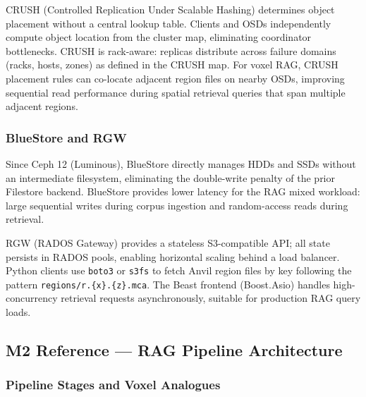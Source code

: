 \documentclass[11pt,letterpaper]{article}
\begin{document}
CRUSH (Controlled Replication Under Scalable Hashing) determines object placement without a central lookup table. Clients and OSDs independently compute object location from the cluster map, eliminating coordinator bottlenecks. CRUSH is rack-aware: replicas distribute across failure domains (racks, hosts, zones) as defined in the CRUSH map. For voxel RAG, CRUSH placement rules can co-locate adjacent region files on nearby OSDs, improving sequential read performance during spatial retrieval queries that span multiple adjacent regions.

\subsubsection{BlueStore and RGW}

Since Ceph 12 (Luminous), BlueStore directly manages HDDs and SSDs without an intermediate filesystem, eliminating the double-write penalty of the prior Filestore backend. BlueStore provides lower latency for the RAG mixed workload: large sequential writes during corpus ingestion and random-access reads during retrieval.

RGW (RADOS Gateway) provides a stateless S3-compatible API; all state persists in RADOS pools, enabling horizontal scaling behind a load balancer. Python clients use \texttt{boto3} or \texttt{s3fs} to fetch Anvil region files by key following the pattern \texttt{regions/r.\{x\}.\{z\}.mca}. The Beast frontend (Boost.Asio) handles high-concurrency retrieval requests asynchronously, suitable for production RAG query loads.

\subsection{M2 Reference --- RAG Pipeline Architecture}

\subsubsection{Pipeline Stages and Voxel Analogues}
\end{document}
